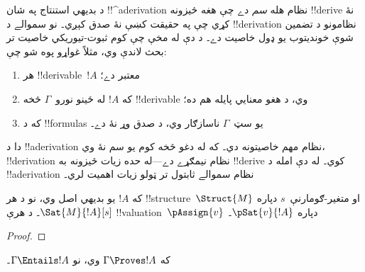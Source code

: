 \documentclass[../../../include/open-logic-section]{subfiles}
\begin{document}
      {}
      {}
      

\begin{explain}
د بديهي استنتاج په شان !!^a{derivation} نظام هله \emph{سم} دے چې
هغه څيزونه !!{derive} نۀ کړي چې په حقيقت کښې نۀ صدق کېږي۔ نو
سموالے د !!{derivation} نظامونو د تضمين شوې خونديتوب يو ډول خاصيت
دے۔ د دې له مخې چې کوم ثبوت-تيوريکي خاصيت تر بحث لاندې وي، مثلاً
غواړو پوه شو چې:
\begin{enumerate}
\item هر !!{derivable}~$!A$ معتبر دے؛
\item که $!A$ له ځينو نورو~$\Gamma$ څخه !!{derivable} وي، د هغو
  معنايي پايله هم ده؛
\item که د !!{formula}s يو سټ~$\Gamma$ ناسازګار وي، د صدق وړ نۀ
  دے۔
\end{enumerate}
دا د !!a{derivation} نظام مهم خاصيتونه دي۔ که له دغو څخه کوم يو
سم نۀ وي، !!{derivation} نظام نيمګړے دے---له حده زيات څيزونه به
!!{derive} کوي۔ له دې امله د !!a{derivation} نظام سموالے ثابتول
تر ټولو زيات اهميت لري۔
\end{explain}

\begin{prop}
  که $!A$ يو بديهي اصل وي، نو
    {د هر !!{structure}~$\Struct{M}$ او متغير-ګومارنې~$s$ دپاره $\Sat{M}{!A}[s]$۔}
    {د هرې !!{valuation}~$\pAssign{v}$ دپاره $\pSat{v}{!A}$۔}
\end{prop}

\begin{proof}
\end{proof}

\begin{thm}[سموالے]
که $\Gamma \Proves !A$ وي، نو $\Gamma \Entails !A$۔
\end{thm}
\end{document}
